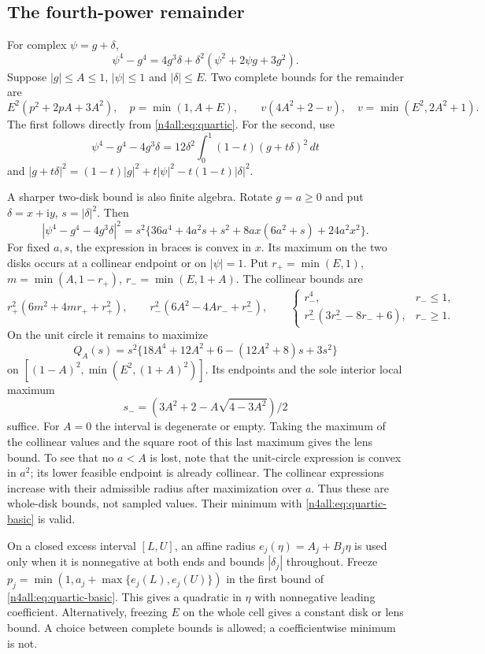 \documentclass[11pt,a4paper]{article}
\numberwithin{equation}{section}
\theoremstyle{definition}
\theoremstyle{remark}
\newcommand{\ii}{\mathrm i}
\begin{document}
\subsection{The fourth-power remainder}
For complex $\psi=g+\delta$,
\begin{equation}\label{n4all:eq:quartic}
 \psi^4-g^4=4g^3\delta+
 \delta^2(\psi^2+2\psi g+3g^2).
\end{equation}
Suppose $|g|\le A\le1$, $|\psi|\le1$ and $|\delta|\le E$.
Two complete bounds for the remainder are
\begin{equation}\label{n4all:eq:quartic-basic}
 E^2(p^2+2pA+3A^2),\quad p=\min(1,A+E),\qquad
 v(4A^2+2-v),\quad v=\min(E^2,2A^2+1).
\end{equation}
The first follows directly from \eqref{n4all:eq:quartic}. For the
second, use
\[
 \psi^4-g^4-4g^3\delta
   =12\delta^2\int_0^1(1-t)(g+t\delta)^2\,dt
\]
and
$|g+t\delta|^2=(1-t)|g|^2+t|\psi|^2-t(1-t)|\delta|^2$.

A sharper two-disk bound is also finite algebra. Rotate $g=a\ge0$
and put $\delta=x+\ii y$, $s=|\delta|^2$. Then
\[
 |\psi^4-g^4-4g^3\delta|^2
 =s^2\{36a^4+4a^2s+s^2+8ax(6a^2+s)+24a^2x^2\}.
\]
For fixed $a,s$, the expression in braces is convex in $x$.
Its maximum on the two disks occurs at a collinear endpoint or on
$|\psi|=1$. Put $r_+=\min(E,1)$, $m=\min(A,1-r_+)$,
$r_-=\min(E,1+A)$. The collinear bounds are
\[
 r_+^2(6m^2+4mr_++r_+^2),\qquad
 r_-^2(6A^2-4Ar_-+r_-^2),\qquad
 \begin{cases}r_-^4,&r_-\le1,\\
 r_-^2(3r_-^2-8r_-+6),&r_-\ge1.
 \end{cases}
\]
On the unit circle it remains to maximize
\begin{equation}\label{n4all:eq:lens-polynomial}
 Q_A(s)=s^2\{18A^4+12A^2+6-(12A^2+8)s+3s^2\}
\end{equation}
on $[(1-A)^2,\min(E^2,(1+A)^2)]$. Its endpoints and the sole
interior local maximum
\[
 s_-=(3A^2+2-A\sqrt{4-3A^2})/2
\]
suffice. For $A=0$ the interval is degenerate or empty.
Taking the maximum of the collinear values and the square root of
this last maximum gives the lens bound. To see that no $a<A$ is
lost, note that the unit-circle expression is convex in $a^2$;
its lower feasible endpoint is already collinear. The collinear
expressions increase with their admissible radius after maximization
over $a$. Thus these are whole-disk bounds, not sampled values.
Their minimum with \eqref{n4all:eq:quartic-basic} is valid.

On a closed excess interval $[L,U]$, an affine radius
$e_j(\eta)=A_j+B_j\eta$ is used only when it is nonnegative at both
ends and bounds $|\delta_j|$ throughout. Freeze
$p_j=\min(1,a_j+\max\{e_j(L),e_j(U)\})$ in the first bound of
\eqref{n4all:eq:quartic-basic}. This gives a quadratic in $\eta$
with nonnegative leading coefficient. Alternatively, freezing $E$
on the whole cell gives a constant disk or lens bound. A choice
between complete bounds is allowed; a coefficientwise minimum is not.
\end{document}
